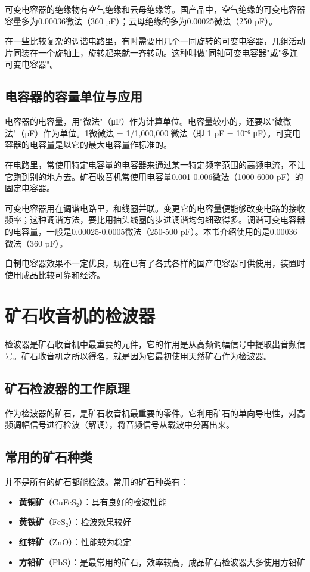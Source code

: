 \documentclass[12pt,UTF8]{ctexbook}
\begin{document}
可变电容器的绝缘物有空气绝缘和云母绝缘等。国产品中，空气绝缘的可变电容器容量多为0.00036微法（360 pF）；云母绝缘的多为0.00025微法（250 pF）。

在一些比较复杂的调谐电路里，有时需要用几个一同旋转的可变电容器，几组活动片同装在一个旋轴上，旋转起来就一齐转动。这种叫做"同轴可变电容器"或"多连可变电容器"。

\section{电容器的容量单位与应用}

电容器的电容量，用"微法"（μF）作为计算单位。电容量较小的，还要以"微微法"（pF）作为单位。1微微法 = 1/1,000,000 微法（即 1 pF = 10⁻⁶ μF）。可变电容器的电容量是以它的最大电容量作标准的。

在电路里，常使用特定电容量的电容器来通过某一特定频率范围的高频电流，不让它跑到别的地方去。矿石收音机常使用电容量0.001-0.006微法（1000-6000 pF）的固定电容器。

可变电容器用在调谐电路里，和线圈并联。变更它的电容量便能够改变电路的接收频率；这种调谐方法，要比用抽头线圈的步进调谐均匀细致得多。调谐可变电容器的电容量，一般是0.00025-0.0005微法（250-500 pF）。本书介绍使用的是0.00036微法（360 pF）。

自制电容器效果不一定优良，现在已有了各式各样的国产电容器可供使用，装置时使用成品比较可靠和经济。

\chapter{矿石收音机的检波器}

检波器是矿石收音机中最重要的元件，它的作用是从高频调幅信号中提取出音频信号。矿石收音机之所以得名，就是因为它最初使用天然矿石作为检波器。

\section{矿石检波器的工作原理}

作为检波器的矿石，是矿石收音机最重要的零件。它利用矿石的单向导电性，对高频调幅信号进行检波（解调），将音频信号从载波中分离出来。

\section{常用的矿石种类}

并不是所有的矿石都能检波。常用的矿石种类有：

\begin{itemize}
	\item \textbf{黄铜矿}（CuFeS₂）：具有良好的检波性能
	\item \textbf{黄铁矿}（FeS₂）：检波效果较好
	\item \textbf{红锌矿}（ZnO）：性能较为稳定
	\item \textbf{方铅矿}（PbS）：是最常用的矿石，效率较高，成品矿石检波器大多使用方铅矿
\end{itemize}
\end{document}
